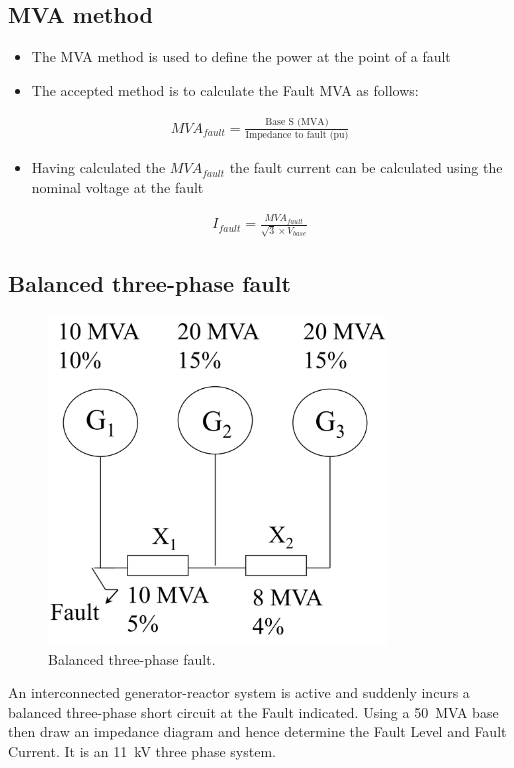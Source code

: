 \subsection{MVA method}
\begin{itemize}
	\item The MVA method is used to define the power at the point of a fault
	\item The accepted method is to calculate the Fault MVA as follows:
\end{itemize}
\begin{gather}
	MVA_{fault} = \frac{\textrm{Base S (MVA)}}{\textrm{Impedance to fault (pu)}}
\end{gather}
\begin{itemize}
	\item Having calculated the $\si{MVA}_{fault}$ the fault current can be calculated using the nominal voltage at the fault
\end{itemize}
\begin{gather}
	I_{fault} = \frac{\si{MVA}_{fault}}{\sqrt{3}\times V_{base}}
\end{gather}
\subsection{Balanced three-phase fault}
\begin{figure}[H]
	\centering
	\includegraphics[width = 0.8\textwidth]{./img/figure17.png}
	\caption{Balanced three-phase fault.}
\end{figure}
An interconnected generator-reactor system is active and suddenly incurs a balanced three-phase short circuit at the Fault indicated. Using a \SI{50}{MVA} base then draw an impedance diagram and hence determine the Fault Level and Fault Current. It is an \SI{11}{kV} three phase system.
